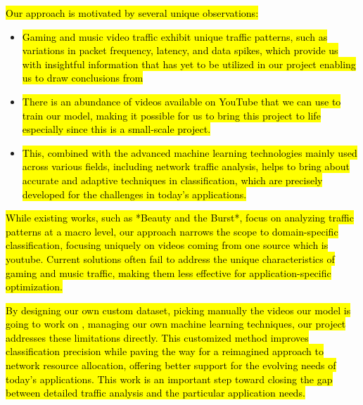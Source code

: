 \hl{Our approach is motivated by several unique observations:}
\begin{itemize}
    \item \hl{Gaming and music video traffic exhibit unique traffic patterns, such as variations in packet frequency, latency, and data spikes, which provide us with insightful information that has yet to be utilized in our project enabling us to draw conclusions from}
    \item \hl{There is an abundance of videos available on YouTube that we can use to train our model, making it possible for us to bring this project to life especially since this is a small-scale project.}
    \item \hl{This, combined with the advanced machine learning technologies mainly used across various fields, including network traffic analysis, helps to bring about accurate and adaptive techniques in classification, which are precisely developed for the challenges in today's applications.}
\end{itemize}

\hl{While existing works, such as *Beauty and the Burst*, focus on analyzing traffic patterns at a macro level, our approach narrows the scope to domain-specific classification, focusing uniquely on videos coming from one source which is youtube. Current solutions often fail to address the unique characteristics of gaming and music traffic, making them less effective for application-specific optimization.}

\vspace{2mm}

\hl{By designing our own custom dataset, picking manually the videos our model is going to work on  , managing our own machine learning techniques, our project addresses these limitations directly. This customized method improves classification precision while paving the way for a reimagined approach to network resource allocation, offering better support for the evolving needs of today's applications. This work is an important step toward closing the gap between detailed traffic analysis and the particular application needs.}